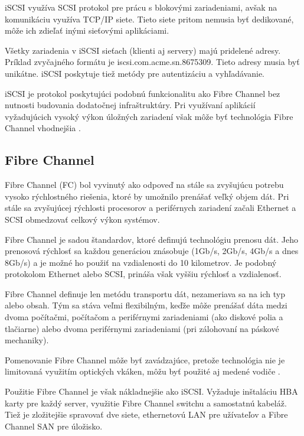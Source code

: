 iSCSI využíva SCSI protokol pre prácu s blokovými zariadeniami, avšak na komunikáciu využíva TCP/IP siete. Tieto siete pritom nemusia byť dedikované, môže ich zdieľať inými sieťovými aplikáciami.

Všetky zariadenia v iSCSI sieťach (klienti aj servery) majú pridelené adresy. Príklad zvyčajného formátu je iscsi.com.acme.sn.8675309. Tieto adresy musia byť unikátne. iSCSI poskytuje tiež metódy pre autentizáciu a vyhľadávanie.

iSCSI je protokol poskytujúci podobnú funkcionalitu ako Fibre Channel bez nutnosti budovania dodatočnej infraštruktúry. Pri využívaní aplikácií vyžadujúcich vysoký výkon úložných zariadení však môže byť technológia Fibre Channel vhodnejšia \cite{pdf:iscsi-fc}.

\subsection{Fibre Channel}
Fibre Channel (FC) bol vyvinutý ako odpoveď na stále sa zvyšujúcu potrebu vysoko rýchlostného riešenia, ktoré by umožnilo prenášať veľký objem dát. Pri stále sa zvyšujúcej rýchlosti procesorov a periférnych zariadení začali Ethernet a SCSI obmedzovať celkový výkon systémov.

Fibre Channel je sadou štandardov, ktoré definujú technológiu prenosu dát. Jeho prenosová rýchlosť sa každou generáciou znásobuje (1Gb/s, 2Gb/s, 4Gb/s a dnes 8Gb/s) a je možné ho použiť na vzdialenosti do 10 kilometrov. Je podobný protokolom Ethernet alebo SCSI, prináša však vyššiu rýchlosť a vzdialenosť.

Fibre Channel definuje len metódu transportu dát, nezameriava sa na ich typ alebo obsah. Tým sa stáva veľmi flexibilným, keďže môže prenášať dáta medzi dvoma počítačmi, počítačom a periférnymi zariadeniami (ako diskové polia a tlačiarne) alebo dvoma periférnymi zariadeniami (pri zálohovaní na páskové mechaniky).

Pomenovanie Fibre Channel môže byť zavádzajúce, pretože technológia nie je limitovaná využitím optických vkáken, môžu byť použité aj medené vodiče \cite{pdf:fc}.

Použitie Fibre Channel je však nákladnejšie ako iSCSI. Vyžaduje inštaláciu HBA karty pre každý server, využitie Fibre Channel switchu a samostatnú kabeláž. Tiež je zložitejšie spravovať dve siete, ethernetovú LAN pre užívateľov a Fibre Channel SAN pre úložisko.

